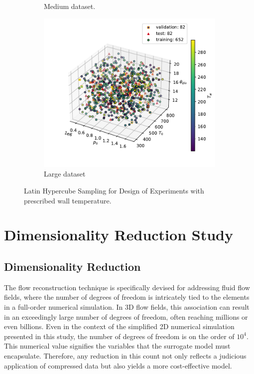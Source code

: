 \begin{figure}[t]
\begin{subfigure}{0.3\textwidth}
        \caption{Medium dataset.}
        \label{fig:lhs_Tw_500}
    \end{subfigure}
    \begin{subfigure}{0.3\textwidth}
        \centering
        \includegraphics[width=\linewidth]{Figuras/lhs/data_Tw/doe_1000/lhs_all.pdf}  
        \caption{Large dataset}
        \label{fig:lhs_Tw_1000}
    \end{subfigure}
    \caption{Latin Hypercube Sampling for Design of Experiments with prescribed wall temperature.}
    \label{fig:lhs_Tw}
\end{figure}

\section{Dimensionality Reduction Study}


\subsection{Dimensionality Reduction}

The flow reconstruction technique is specifically devised for addressing fluid flow fields, where the number of degrees of freedom is intricately tied to the elements in a full-order numerical simulation. In 3D flow fields, this association can result in an exceedingly large number of degrees of freedom, often reaching millions or even billions. Even in the context of the simplified 2D numerical simulation presented in this study, the number of degrees of freedom is on the order of $10^4$. This numerical value signifies the variables that the surrogate model must encapsulate. Therefore, any reduction in this count not only reflects a judicious application of compressed data but also yields a more cost-effective model.

